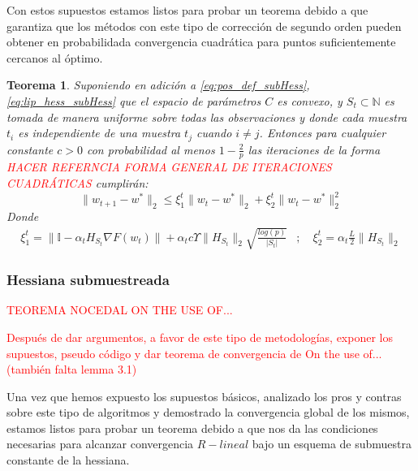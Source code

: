 \documentclass{book}
\theoremstyle{plain}
\newtheorem{thm}{Teorema}[section]
\theoremstyle{definition}
\theoremstyle{remark}
\begin{document}
Con estos supuestos estamos listos para probar un teorema debido a \cite{ERDOGDU} que garantiza que los métodos con este tipo de corrección de segundo orden pueden obtener en probabilidada convergencia cuadrática para puntos suficientemente cercanos al óptimo.

\begin{thm}\label{thm:quad_conv}
Suponiendo en adición a \ref{eq:pos_def_subHess}, \ref{eq:lip_hess_subHess} que el espacio de parámetros $C$ es convexo, y $S_t\subset\mathbb{N}$ es tomada de manera uniforme sobre todas las observaciones y donde cada muestra $t_i$ es independiente de una muestra $t_j$ cuando $i\neq j$. Entonces para cualquier constante $c>0$ con probabilidad al menos $1-\frac{2}{p}$ las iteraciones de la forma \textcolor{red}{HACER REFERNCIA FORMA GENERAL DE ITERACIONES CUADRÁTICAS} cumplirán:
\begin{equation}
    \|w_{t+1} - w^*\|_2 \leq \xi_1^t\|w_{t} - w^*\|_2 + \xi_2^t\|w_t - w^*\|_2^2
\end{equation}
Donde
\begin{equation*}
\begin{split}
    \xi_1^t = \|\mathbb{I} - \alpha_t H_{S_t}\nabla F(w_t) \| + \alpha_t c \Upsilon\|H_{S_t}\|_2\sqrt{\frac{log(p)}{|S_t|}} &;\quad \xi_2^t = \alpha_t \frac{L}{2}\|H_{S_t}\|_2
\end{split}
\end{equation*}
\end{thm}

\subsubsection{Hessiana submuestreada}

\textcolor{red}{TEOREMA NOCEDAL ON THE USE OF...}

\textcolor{red}{Después de dar argumentos, a favor de este tipo de metodologías, exponer los supuestos, pseudo código y dar teorema de convergencia de On the use of... (también falta lemma 3.1)}

Una vez que hemos expuesto los supuestos básicos, analizado los pros y contras sobre este tipo de algoritmos y demostrado la convergencia global de los mismos, estamos listos para probar un teorema debido a \cite{ROOSTA} que nos da las condiciones necesarias para alcanzar convergencia $R-lineal$ bajo un esquema de submuestra constante de la hessiana.
\end{document}
